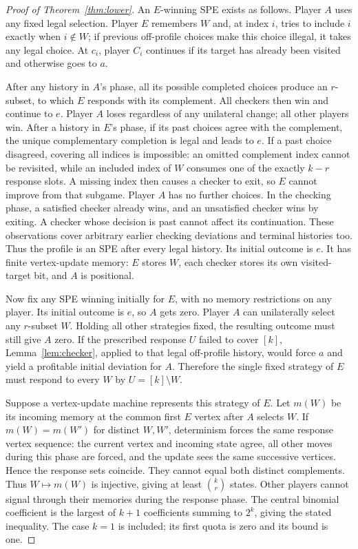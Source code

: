 \documentclass[acmlarge,11pt,screen,nonacm,natbib=false]{acmart}
\theoremstyle{remark}
\begin{document}
\begin{proof}[Proof of Theorem~\ref{thm:lower}]
An $E$-winning SPE exists as follows. Player $A$ uses any fixed legal
selection. Player $E$ remembers $W$ and, at index $i$, tries to include
$i$ exactly when $i\notin W$; if previous off-profile choices make this
choice illegal, it takes any legal choice. At $c_i$, player $C_i$ continues
if its target has already been visited and otherwise goes to $a$.

After any history in $A$'s phase, all its possible completed choices produce
an $r$-subset, to which $E$ responds with its complement. All checkers
then win and continue to $e$. Player $A$ loses regardless of any unilateral
change; all other players win. After a history in $E$'s phase, if its past
choices agree with the complement, the unique complementary completion
is legal and leads to $e$. If a past choice disagreed, covering all indices
is impossible: an omitted complement index cannot be revisited, while an
included index of $W$ consumes one of the exactly $k-r$ response slots.
A missing index then causes a checker to exit, so $E$ cannot improve from
that subgame. Player $A$ has no further choices. In the checking phase,
a satisfied checker already wins, and an unsatisfied checker wins by exiting.
A checker whose decision is past cannot affect its continuation. These
observations cover arbitrary earlier checking deviations and terminal
histories too. Thus the profile is an SPE after every legal history.
Its initial outcome is $e$. It has finite vertex-update memory: $E$ stores
$W$, each checker stores its own visited-target bit, and $A$ is positional.

Now fix any SPE winning initially for $E$, with no memory restrictions
on any player. Its initial outcome is $e$, so $A$ gets zero. Player $A$
can unilaterally select any $r$-subset $W$. Holding all other strategies
fixed, the resulting outcome must still give $A$ zero. If the prescribed
response $U$ failed to cover $[k]$, Lemma~\ref{lem:checker}, applied to
that legal off-profile history, would force $a$ and yield a profitable
initial deviation for $A$. Therefore the single fixed strategy of $E$
must respond to every $W$ by $U=[k]\setminus W$.

Suppose a vertex-update machine represents this strategy of $E$. Let $m(W)$
be its incoming memory at the common first $E$ vertex after $A$ selects $W$.
If $m(W)=m(W')$ for distinct $W,W'$, determinism forces the same response
vertex sequence: the current vertex and incoming state agree, all other
moves during this phase are forced, and the update sees the same successive
vertices. Hence the response sets coincide. They cannot equal both distinct
complements. Thus $W\mapsto m(W)$ is injective, giving at least
$\binom{k}{r}$ states. Other players cannot signal through their memories
during the response phase. The central binomial coefficient is the largest
of $k+1$ coefficients summing to $2^k$, giving the stated inequality.
The case $k=1$ is included; its first quota is zero and its bound is one.
\end{proof}
\end{document}
